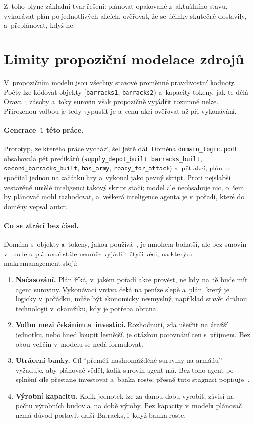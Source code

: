 Z~toho plyne základní tvar řešení: plánovat opakovaně z~aktuálního stavu, vykonávat plán po jednotlivých akcích, ověřovat, že se účinky skutečně dostavily, a~přeplánovat, když ne.

\section{Limity propoziční modelace zdrojů}
\label{sec:limity}

V~propozičním modelu jsou všechny stavové proměnné pravdivostní hodnoty. Počty lze kódovat objekty (\texttt{barracks1}, \texttt{barracks2}) a~kapacity tokeny, jak to dělá Orava~\cite{Orava2025}; zásoby a~toky surovin však propozičně vyjádřit rozumně nelze. Přirozenou volbou je tedy vypustit je a~cenu akcí ověřovat až při vykonávání.

\paragraph{Generace~1 této práce.} Prototyp, ze kterého práce vychází, šel ještě dál. Doména \texttt{domain\_logic.pddl} obsahovala pět predikátů (\texttt{supply\_depot\_built}, \texttt{barracks\_built}, \texttt{second\_barracks\_built}, \texttt{has\_army}, \texttt{ready\_for\_attack}) a~pět akcí, plán se spočítal jednou na začátku hry a~vykonal jako pevný skript. Proti nejslabší vestavěné umělé inteligenci takový skript stačí; model ale neobsahuje nic, o~čem by plánovač mohl rozhodovat, a~veškerá inteligence agenta je v~pořadí, které do domény vepsal autor.

\paragraph{Co se ztrácí bez čísel.} Doména s~objekty a~tokeny, jakou používá~\cite{Orava2025}, je mnohem bohatší, ale bez surovin v~modelu plánovač stále nemůže vyjádřit čtyři věci, na kterých makromanagement stojí:
\begin{enumerate}
	\item \textbf{Načasování.} Plán říká, v~jakém pořadí akce provést, ne kdy na ně bude mít agent suroviny. Vykonávací vrstva čeká na peníze slepě a~plán, který je logicky v~pořádku, může být ekonomicky nesmyslný, například stavět drahou technologii v~okamžiku, kdy je potřeba obrana.
	\item \textbf{Volbu mezi čekáním a~investicí.} Rozhodnutí, zda ušetřit na dražší jednotku, nebo hned koupit levnější, je otázkou porovnání cen s~příjmem. Bez obou veličin v~modelu se nedá formulovat.
	\item \textbf{Utrácení banky.} Cíl \enquote{přeměň nashromážděné suroviny na armádu} vyžaduje, aby plánovač věděl, kolik surovin agent má. Bez toho agent po splnění cíle přestane investovat a~banka roste; přesně tuto stagnaci popisuje~\cite[kap.~6.2]{Orava2025}.
	\item \textbf{Výrobní kapacitu.} Kolik jednotek lze za danou dobu vyrobit, závisí na počtu výrobních budov a~na době výroby. Bez kapacity v~modelu plánovač nemá důvod postavit další Barracks, i~když banka roste.
\end{enumerate}

